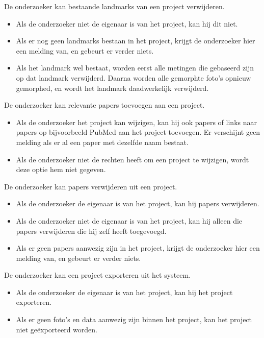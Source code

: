 \noindent
De onderzoeker kan bestaande landmarks van een project verwijderen.
\begin{itemize}
	\item Als de onderzoeker niet de eigenaar is van het project, kan hij dit niet.
	\item Als er nog geen landmarks bestaan in het project, krijgt de onderzoeker hier een melding van, en gebeurt er verder niets.
	\item Als het landmark wel bestaat, worden eerst alle metingen die gebaseerd zijn op dat landmark verwijderd. Daarna worden alle gemorphte foto's opnieuw gemorphed, en wordt het landmark daadwerkelijk verwijderd.
\end{itemize}

\noindent
De onderzoeker kan relevante papers toevoegen aan een project.
\begin{itemize}
	\item Als de onderzoeker het project kan wijzigen, kan hij ook papers of links naar papers op bijvoorbeeld PubMed aan het project toevoegen. Er verschijnt geen melding als er al een paper met dezelfde naam bestaat. 
	\item Als de onderzoeker niet de rechten heeft om een project te wijzigen, wordt deze optie hem niet gegeven.
\end{itemize}

\noindent
De onderzoeker kan papers verwijderen uit een project.
\begin{itemize}
	\item Als de onderzoeker de eigenaar is van het project, kan hij papers verwijderen.
	\item Als de onderzoeker niet de eigenaar is van het project, kan hij alleen die papers verwijderen die hij zelf heeft toegevoegd.
	\item Als er geen papers aanwezig zijn in het project, krijgt de onderzoeker hier een melding van, en gebeurt er verder niets.
\end{itemize}

\noindent
De onderzoeker kan een project exporteren uit het systeem.
\begin{itemize}
	\item Als de onderzoeker de eigenaar is van het project, kan hij het project exporteren.
	\item Als er geen foto's en data aanwezig zijn binnen het project, kan het project niet ge\"exporteerd worden.
\end{itemize}

